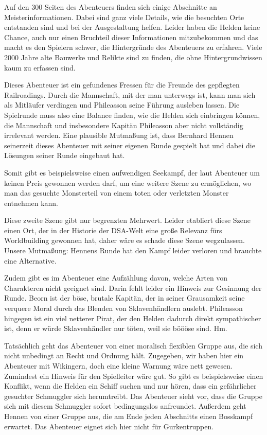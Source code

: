 \documentclass[final]{multiversum}
\begin{document}
Auf den 300 Seiten des Abenteuers finden sich einige Abschnitte an
Meisterinformationen. Dabei sind ganz viele Details, wie die besuchten Orte
entstanden sind und bei der Ausgestaltung helfen. Leider haben die Helden keine
Chance, auch nur einen Bruchteil dieser Informationen mitzubekommen und das
macht es den Spielern schwer, die Hintergründe des Abenteuers zu erfahren. Viele
2000 Jahre alte Bauwerke und Relikte sind zu finden, die ohne Hintergrundwissen
kaum zu erfassen sind.

Dieses Abenteuer ist ein gefundenes Fressen für die Freunde des gepflegten
Railroadings. Durch die Mannschaft, mit der man unterwegs ist, kann man sich als
Mitläufer verdingen und Phileasson seine Führung ausleben lassen. Die Spielrunde
muss also eine Balance finden, wie die Helden sich einbringen können, die
Mannschaft und insbesondere Kapitän Phileasson aber nicht vollständig irrelevant
werden. Eine plausible Mutmaßung ist, dass Bernhard Hennen seinerzeit dieses
Abenteuer mit seiner eigenen Runde gespielt hat und dabei die Lösungen seiner
Runde eingebaut hat.

Somit gibt es beispielsweise einen aufwendigen Seekampf, der laut Abenteuer um
keinen Preis gewonnen werden darf, um eine weitere Szene zu ermöglichen, wo man
das gesuchte Monsterteil von einem toten oder verletzten Monster entnehmen kann.

Diese zweite Szene gibt nur begrenzten Mehrwert. Leider etabliert diese Szene
einen Ort, der in der Historie der DSA-Welt eine große Relevanz fürs
Worldbuilding gewonnen hat, daher wäre es schade diese Szene wegzulassen. Unsere
Mutmaßung: Hennens Runde hat den Kampf leider verloren und brauchte eine
Alternative.

Zudem gibt es im Abenteuer eine Aufzählung davon, welche Arten von Charakteren
nicht geeignet sind. Darin fehlt leider ein Hinweis zur Gesinnung der Runde.
Beorn ist der böse, brutale Kapitän, der in seiner Grausamkeit seine verquere
Moral durch das Blenden von Sklavenhändlern auslebt. Phileasson hingegen ist ein
viel netterer Pirat, der den Helden dadurch direkt sympathischer ist, denn er
würde Sklavenhändler nur töten, weil sie böööse sind. Hm.

Tatsächlich geht das Abenteuer von einer moralisch flexiblen Gruppe aus, die
sich nicht unbedingt an Recht und Ordnung hält. Zugegeben, wir haben hier ein
Abenteuer mit Wikingern, doch eine kleine Warnung wäre nett gewesen. Zumindest
ein Hinweis für den Spielleiter wäre gut. So gibt es beispielsweise einen
Konflikt, wenn die Helden ein Schiff suchen und nur hören, dass ein gefährlicher
gesuchter Schmuggler sich herumtreibt. Das Abenteuer sieht vor, dass die Gruppe
sich mit diesem Schmuggler sofort bedingungslos anfreundet. Außerdem geht Hennen
von einer Gruppe aus, die am Ende jeden Abschnitts einen Bosskampf erwartet. Das
Abenteuer eignet sich hier nicht für Gurkentruppen.
\end{document}
